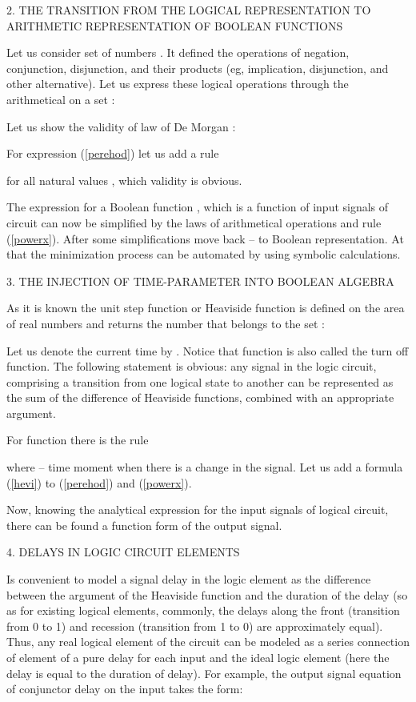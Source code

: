 \documentclass[12pt]{article}
\newcommand{\reff}[1]{(\ref{#1})}
\begin{document}
\begin{center}
   2. THE TRANSITION FROM THE LOGICAL REPRESENTATION TO ARITHMETIC
      REPRESENTATION OF BOOLEAN FUNCTIONS
\end{center}

Let us consider set of numbers . It defined the operations of
negation, conjunction, disjunction, and their products (eg, implication,
disjunction, and other alternative). Let us express these logical operations
through the arithmetical on a set :


Let us show the validity of law of De Morgan  :


For expression \reff{perehod} let us add a rule

for all natural values , which  validity is obvious.

The expression for a Boolean function , which is a function of input signals
of circuit can now be simplified by the laws of arithmetical operations and rule
\reff{powerx}. After some simplifications move back -- to Boolean
representation. At that the minimization process can be automated by using
symbolic calculations.

\begin{center}
   3. THE INJECTION OF TIME-PARAMETER INTO BOOLEAN ALGEBRA
\end{center}

As it is known the unit step function or Heaviside function is defined on the
area of real numbers and returns the number that belongs to the set :


Let us denote the current time by . Notice that function  is also called
the turn off function. The following statement is obvious: any signal in the
logic circuit, comprising a transition from one logical state to another can be
represented as the sum of the difference of Heaviside functions, combined with
an appropriate argument.

For function  there is the rule

where  -- time moment when there is a change in the signal. Let us add a
formula \reff{hevi} to \reff{perehod} and \reff{powerx}.

Now, knowing the analytical expression for the input signals of logical circuit,
there can be found a function form of the output signal.

\begin{center}
   4. DELAYS IN LOGIC CIRCUIT ELEMENTS
\end{center}

Is convenient to model a signal delay in the logic element as the difference
between the argument of the Heaviside function and the duration of the delay (so
as for existing logical elements, commonly, the delays along the front
(transition from 0 to 1) and recession (transition from 1 to 0) are
approximately equal). Thus, any real logical element of the circuit can be
modeled as a series connection of element of a pure delay \cite{4} for each
input and the ideal logic element (here the delay is equal to the duration of
delay). For example, the output signal equation of conjunctor delay  on
the input takes the form:
\end{document}
